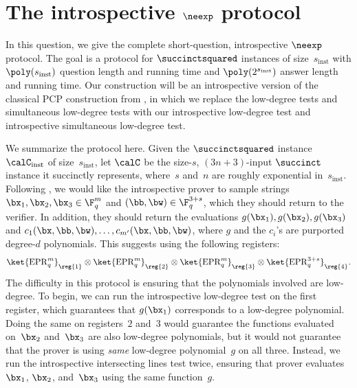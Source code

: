 \section{The introspective $\neexp$ protocol}\label{sec:big-neexp-protocol}

In this question, we give the complete short-question, introspective $\neexp$ protocol.
The goal is a protocol for $\succinctsquared$ instances of size~$s_{\mathrm{inst}}$
with $\poly(s_{\mathrm{inst}})$ question length and running time and $\poly(2^{s_{\mathrm{inst}}})$ answer length and running time.
Our construction will be an introspective version of the classical PCP construction from ,
in which we replace the low-degree tests and simultaneous low-degree tests
with our introspective low-degree test and introspective simultaneous low-degree test.

We summarize the protocol here.
Given the $\succinctsquared$ instance~$\calC_{\mathrm{inst}}$
of size~$s_{\mathrm{inst}}$,
let $\calC$ be the size-$s$, $(3n+3)$-input $\succinct$ instance it succinctly represents,
where~$s$ and~$n$ are roughly exponential in~$s_{\mathrm{inst}}$.
Following ,
we would like the introspective prover to sample strings $\bx_1, \bx_2, \bx_3 \in \F_q^m$ and $(\bb, \bw) \in \F_q^{3+s}$,
which they should return to the verifier.
In addition, they should return the evaluations $g(\bx_1), g(\bx_2), g(\bx_3)$ and $c_1(\bx, \bb, \bw), \ldots, c_{m'}(\bx, \bb, \bw)$,
where $g$ and the $c_i$'s are purported degree-$d$ polynomials.
This suggests using the following registers:
\begin{equation*}
\ket{\mathrm{EPR}_q^m}_{\reg{1}}
\otimes \ket{\mathrm{EPR}_q^m}_{\reg{2}}
\otimes \ket{\mathrm{EPR}_q^m}_{\reg{3}}
\otimes \ket{\mathrm{EPR}_q^{3+s}}_{\reg{4}}.
\end{equation*}
The difficulty in this protocol is ensuring that the polynomials involved are low-degree.
To begin, we can run the introspective low-degree test on the first register,
which guarantees that $g(\bx_1)$ corresponds to a low-degree polynomial. 
Doing the same on registers~$2$ and~$3$ would guarantee
the functions evaluated on~$\bx_2$ and~$\bx_3$ are also low-degree polynomials,
but it would not guarantee that the prover is using \emph{same} low-degree polynomial~$g$ on all three.
Instead, we run the introspective intersecting lines test twice,
ensuring that prover evaluates~$\bx_1$, $\bx_2$, and~$\bx_3$ using the same function~$g$.

